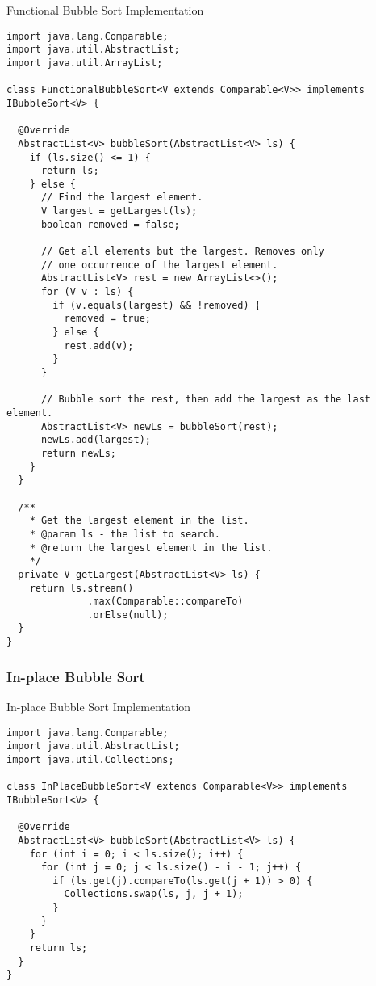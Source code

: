 \begin{cl}[]{Functional Bubble Sort Implementation}
\begin{lstlisting}[language=MyJava]
import java.lang.Comparable;
import java.util.AbstractList;
import java.util.ArrayList;

class FunctionalBubbleSort<V extends Comparable<V>> implements IBubbleSort<V> {

  @Override
  AbstractList<V> bubbleSort(AbstractList<V> ls) {
    if (ls.size() <= 1) { 
      return ls; 
    } else {
      // Find the largest element.
      V largest = getLargest(ls);
      boolean removed = false;

      // Get all elements but the largest. Removes only
      // one occurrence of the largest element.
      AbstractList<V> rest = new ArrayList<>();
      for (V v : ls) {
        if (v.equals(largest) && !removed) { 
          removed = true; 
        } else { 
          rest.add(v); 
        }
      }

      // Bubble sort the rest, then add the largest as the last element.
      AbstractList<V> newLs = bubbleSort(rest);
      newLs.add(largest);
      return newLs;
    }
  }

  /**
    * Get the largest element in the list.
    * @param ls - the list to search.
    * @return the largest element in the list.
    */
  private V getLargest(AbstractList<V> ls) {
    return ls.stream()
              .max(Comparable::compareTo)
              .orElse(null);
  }
}
\end{lstlisting}
\end{cl}

\subsubsection*{In-place Bubble Sort}
\begin{cl}[]{In-place Bubble Sort Implementation}
\begin{lstlisting}[language=MyJava]
import java.lang.Comparable;
import java.util.AbstractList;
import java.util.Collections;

class InPlaceBubbleSort<V extends Comparable<V>> implements IBubbleSort<V> {

  @Override
  AbstractList<V> bubbleSort(AbstractList<V> ls) {
    for (int i = 0; i < ls.size(); i++) {
      for (int j = 0; j < ls.size() - i - 1; j++) {
        if (ls.get(j).compareTo(ls.get(j + 1)) > 0) {
          Collections.swap(ls, j, j + 1);
        }
      }
    }
    return ls;
  }
}
\end{lstlisting}
\end{cl}

